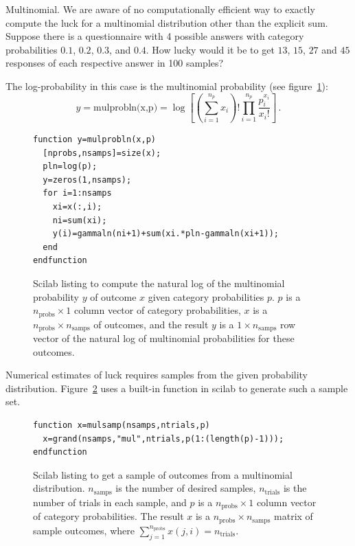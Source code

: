 \begin{example}{Multinomial.} We are aware of no computationally efficient way to exactly compute the luck for a multinomial distribution other than the explicit sum.  Suppose there is a questionnaire with 4 possible answers with category probabilities $0.1$, $0.2$, $0.3$, and $0.4$.  How lucky would it be to get $13$, $15$, $27$ and $45$ responses of each respective answer in 100 samples? 


The log-probability in this case is the multinomial probability (see figure~\ref{fig:mulprobln}):
\begin{equation}
y=\text{mulprobln(x,p)}=\log \left[\left(\sum_{i=1}^{n_p} x_i \right)! \prod_{i=1}^{n_p} \frac{p_i^{x_i}}{x_i!} \right]\,.
\end{equation}

\begin{figure}
\caption{\label{fig:mulprobln}Scilab listing to compute the natural log of the multinomial probability $y$ of outcome $x$ given category probabilities $p$.  $p$ is a $n_{\text{probs}} \times 1$ column vector of category probabilities, $x$ is a $n_{\text{probs}} \times n_{\text{samps}}$ of outcomes, and the result $y$ is a $1 \times n_{\text{samps}}$ row vector of the natural log of multinomial probabilities for these outcomes.}
\lstset{language=Scilab}
\begin{lstlisting}
function y=mulprobln(x,p)
  [nprobs,nsamps]=size(x);
  pln=log(p);
  y=zeros(1,nsamps);
  for i=1:nsamps
    xi=x(:,i);
    ni=sum(xi);
    y(i)=gammaln(ni+1)+sum(xi.*pln-gammaln(xi+1));
  end
endfunction
\end{lstlisting}
\end{figure}

Numerical estimates of luck requires samples from the given probability distribution.  Figure~\ref{fig:mulsamps} uses a built-in function in scilab to generate such a sample set.
\begin{figure}
\caption{\label{fig:mulsamps}Scilab listing to get a sample of outcomes from a multinomial distribution.  $n_{\text{samps}}$ is the number of desired samples, $n_{\text{trials}}$ is the number of trials in each sample, and $p$ is a $n_{\text{probs}} \times 1$ column vector of category probabilities.  The result $x$ is a $n_{\text{probs}} \times n_{\text{samps}}$ matrix of sample outcomes, where $\sum_{j=1}^{n_{\text{probs}}} x(j,i)=n_{\text{trials}}$.}
\lstset{language=Scilab}
\begin{lstlisting}
function x=mulsamp(nsamps,ntrials,p)
  x=grand(nsamps,"mul",ntrials,p(1:(length(p)-1)));
endfunction
\end{lstlisting}
\end{figure}


\end{example}
